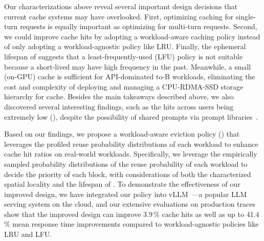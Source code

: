 Our characterizations above reveal several important design decisions
that current {\kvcache} cache systems may have overlooked.
First, optimizing caching for single-turn requests is equally important as optimizing
for multi-turn requests.
Second, we could improve cache hits
by adopting a workload-aware caching policy
instead of only adopting a workload-agnostic policy like LRU.
Finally, the ephemeral lifespan of {\kvcache} suggests that
a least-frequently-used (LFU) policy is not suitable because a short-lived {\kvcache} 
may have high frequency in the past. 
Meanwhile, 
a small (on-GPU) cache is sufficient for API-dominated to-B workloads,
eliminating the cost and complexity of
deploying and managing a CPU-RDMA-SSD storage hierarchy for {\kvcache} cache.
Besides the main takeaways described above, 
we also discovered several interesting findings, 
such as the {\kvcache} hits across users being extremely low (\textsection{\ref{sec:workload-patterns}}),
despite the possibility of shared prompts via prompt libraries~\cite{prompt-library}. 

Based on our findings,
we propose a workload-aware {\kvcache} eviction policy (\textsection{\ref{sec:design-policy}}) that leverages
the profiled reuse probability distributions of each workload to enhance cache hit ratios
on real-world workloads.
Specifically, we leverage the empirically sampled probability distributions of the reuse probability 
of each workload to decide the priority of each {\kvcache} block, 
with considerations of both the characterized spatial locality and the lifespan of {\kvcache}.
To demonstrate the effectiveness of our improved design,
we have integrated our policy into vLLM~\cite{vllm}---a popular LLM serving system on the cloud,
and our extensive evaluations on production traces show that
the improved design can improve 3.9\,\% cache hits
as well as up to 41.4\,\% mean response time improvements
compared to workload-agnostic policies like LRU and LFU.

